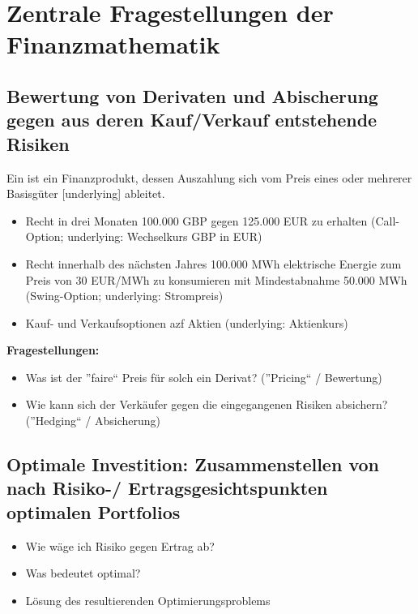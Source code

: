 \section{Zentrale Fragestellungen der Finanzmathematik}

\subsection{Bewertung von Derivaten und Abischerung gegen aus deren Kauf/Verkauf entstehende Risiken}

\begin{definition}[Derivat]
	Ein  ist ein Finanzprodukt, dessen Auszahlung sich vom Preis eines oder mehrerer Basisgüter [underlying] ableitet.
\end{definition}

\begin{beispiel}
	\begin{itemize}[nolistsep, leftmargin=*, topsep=-\parskip]
		\item Recht in drei Monaten 100.000 GBP gegen 125.000 EUR zu erhalten (Call-Option; underlying: Wechselkurs GBP in EUR)
		\item Recht innerhalb des nächsten Jahres 100.000 MWh elektrische Energie zum Preis von 30 EUR/MWh zu konsumieren mit Mindestabnahme 50.000 MWh (Swing-Option; underlying: Strompreis)
		\item Kauf- und Verkaufsoptionen azf Aktien (underlying: Aktienkurs)
	\end{itemize}
\end{beispiel}

\textbf{Fragestellungen:}
\begin{itemize}[nolistsep, label=--, topsep=-\parskip]
	\item Was ist der ''faire`` Preis für solch ein Derivat? (''Pricing`` / Bewertung)
	\item Wie kann sich der Verkäufer gegen die eingegangenen Risiken absichern? (''Hedging`` / Absicherung)
\end{itemize}

\subsection{Optimale Investition: Zusammenstellen von nach Risiko-/ Ertragsgesichtspunkten optimalen Portfolios}

\begin{itemize}[nolistsep, leftmargin=*, topsep=-\parskip]
	\item Wie wäge ich Risiko gegen Ertrag ab?
	\item Was bedeutet optimal?
	\item Lösung des resultierenden Optimierungsproblems
\end{itemize}

